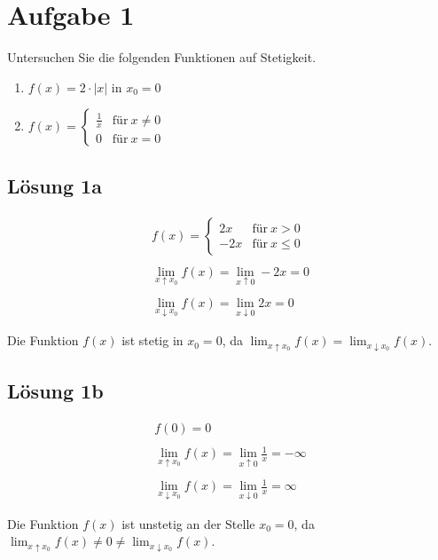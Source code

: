 \documentclass[main.tex]{subfiles}
\begin{document}
\section{Aufgabe 1}

Untersuchen Sie die folgenden Funktionen auf Stetigkeit.

\begin{enumerate}
    \item $f( x) =2\cdotp |x|$ in $x_{0} =0$
    \item $f( x) =\begin{cases}
        \frac{1}{x} & \text{für} \ x\neq 0\\
        0 & \text{für} \ x=0
        \end{cases}$
\end{enumerate}

\subsection{Lösung 1a}
\begin{gather*}
    f( x) =\begin{cases}
    2x & \text{für} \ x >0\\
    -2x & \text{für} \ x\leq 0
    \end{cases}\\
    \\
    \lim _{x\uparrow x_{0}} f( x) =\lim _{x\uparrow 0} -2x=0\\
    \\
    \lim _{x\downarrow x_{0}} f( x) =\lim _{x\downarrow 0} 2x=0
\end{gather*}

Die Funktion $f( x)$ ist stetig in $x_{0} =0$, da $\lim _{x\uparrow x_{0}} f( x) =\lim _{x\downarrow x_{0}} f( x)$.

\subsection{Lösung 1b}
\begin{gather*}
    f( 0) =0\\
    \\
    \lim _{x\uparrow x_{0}} f( x) =\lim _{x\uparrow 0}\frac{1}{x} =-\infty \\
    \\
    \lim _{x\downarrow x_{0}} f( x) =\lim _{x\downarrow 0}\frac{1}{x} =\infty
\end{gather*}

Die Funktion $f( x)$ ist unstetig an der Stelle $x_{0} =0$, da $\lim _{x\uparrow x_{0}} f( x) \neq 0\neq \lim _{x\downarrow x_{0}} f( x)$.
\end{document}
